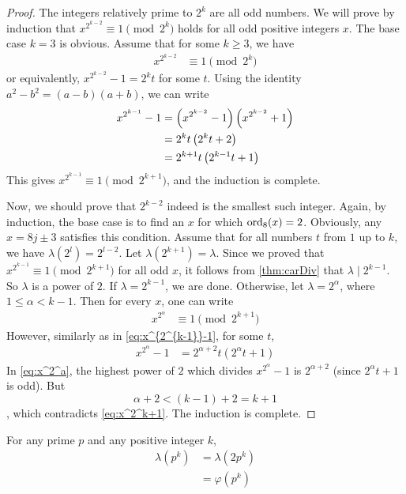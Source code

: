 \begin{proof}
	The integers relatively prime to $2^k$ are all odd numbers. We will prove by induction that $x^{2^{k-2}} \equiv1\pmod{2^k}$ holds for all odd positive integers $x$. The base case $k=3$ is obvious. Assume that for some $k\geq 3$, we have
		\begin{align*}
			x^{2^{k-2}} & \equiv1\pmod{2^k}
		\end{align*}
	or equivalently, $x^{2^{k-2}} -1=2^kt$ for some $t$. Using the identity $a^2-b^2=(a-b)(a+b)$, we can write
		\begin{align}
			x^{2^{k-1}} -1
				& = \parenthesis{x^{2^{k-2}} -1}\parenthesis{x^{2^{k-2}} +1}\\
				& = 2^{k}t\parenthesis{2^kt +2}\\
				& = 2^{k+1}t \left(2^{k-1}t+1\right) \label{eq:x^{2^{k-1}}-1}
		\end{align}
	This gives $x^{2^{k-1}} \equiv 1\pmod{2^{k+1}}$, and the induction is complete.

	Now, we should prove that $2^{k-2}$ indeed is the smallest such integer. Again, by induction, the base case is to find an $x$ for which $\operatorname{ord}_8(x)=2$. Obviously, any $x=8j\pm3$ satisfies this condition. Assume that for all numbers $t$ from $1$ up to $k$, we have $\lambda(2^l)=2^{l-2}$. Let $\lambda(2^{k+1})=\lambda$. Since we proved that $x^{2^{k-1}} \equiv 1\pmod{2^{k+1}}$ for all odd $x$, it follows from \autoref{thm:carDiv} that $\lambda \mid 2^{k-1}$. So $\lambda$ is a power of $2$. If $\lambda = 2^{k-1}$, we are done. Otherwise, let $\lambda=2^\alpha$, where $1 \leq \alpha <k-1$. Then for every $x$, one can write
		\begin{align}\label{eq:x^2^k+1}
			x^{2^\alpha}
				& \equiv 1 \pmod{2^{k+1}}
		\end{align}
	However, similarly as in \eqref{eq:x^{2^{k-1}}-1}, for some $t$,
		\begin{align}\label{eq:x^2^a}
			x^{2^{\alpha}} -1
				&= 2^{\alpha+2}t \left(2^{\alpha}t+1\right)
		\end{align}
	In \eqref{eq:x^2^a}, the highest power of $2$ which divides $x^{2^{\alpha}} -1$ is $2^{\alpha+2}$ (since $2^{\alpha}t+1$ is odd). But $$\alpha+2 <(k-1)+2=k+1$$, which contradicts \eqref{eq:x^2^k+1}. The induction is complete.
\end{proof}

\begin{theorem}
	For any prime $p$ and any positive integer $k$,
		\begin{align*}
			\lambda(p^k)
				& =\lambda(2p^k)\\
				& =\varphi(p^k)
		\end{align*}
\end{theorem}

